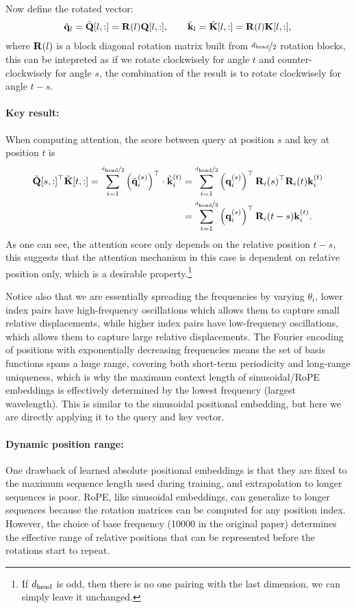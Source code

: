 \documentclass[11pt]{article}  %
\begin{document}
Now define the rotated vector: 
\begin{align}
  \tilde{\mathbf{q}}_l = \tilde{\mathbf{Q}}[l, :] = \mathbf{R}(l)\mathbf{Q}[l, :], \qquad \tilde{\mathbf{k}}_l = \tilde{\mathbf{K}}[l, :] = \mathbf{R}(l)\mathbf{K}[l, :],
\end{align}
where $\mathbf{R}(l)$ is a block diagonal rotation matrix built from $\nicefrac{d_{\text{head}}}{2}$ rotation blocks, this can be intepreted as if we rotate clockwisely for angle $t$ and counter-clockwisely for angle $s$, the combination of the result is to rotate clockwisely for angle $t-s$.

\paragraph{Key result:}
When computing attention, the score between query at position $s$ and key at position $t$ is 
\begin{align}
  \tilde{\mathbf{Q}}[s, :]^{\top}\tilde{\mathbf{K}}[t, :] = \sum_{i=1}^{\nicefrac{d_{\text{head}}}{2}} \left( \tilde{\mathbf{q}}_i^{(s)} \right)^{\top} \cdot \tilde{\mathbf{k}}_i^{(t)} &= \sum_{i=1}^{\nicefrac{d_{\text{head}}}{2}} \left( \mathbf{q}_i^{(s)} \right)^{\top} \mathbf{R}_i(s)^{\top}\mathbf{R}_i(t) \mathbf{k}_i^{(t)}\notag \\
  &= \sum_{i=1}^{\nicefrac{d_{\text{head}}}{2}} \left( \mathbf{q}_i^{(s)} \right)^{\top}\mathbf{R}_i(t - s) \mathbf{k}_i^{(t)}.
\end{align}
As one can see, the attention score only depends on the relative position $t - s$, this suggests that the attention mechanism in this case is dependent on relative position only, which is a desirable property.\footnote{If $d_{\text{head}}$ is odd, then there is no one pairing with the last dimension, we can simply leave it unchanged.}

Notice also that we are essentially spreading the frequencies by varying $\theta_i$, lower index pairs have high-frequency oscillations which allows them to capture small relative displacements, while higher index pairs have low-frequency oscillations, which allows them to capture large relative displacements.
The Fourier encoding of positions with exponentially decreasing frequencies means the set of basis functions spans a huge range, covering both short-term periodicity and long-range uniqueness, which is why the maximum context length of sinusoidal/RoPE embeddings is effectively determined by the lowest frequency (largest wavelength).
This is similar to the sinusoidal positional embedding, but here we are directly applying it to the query and key vector.


\paragraph{Dynamic position range:}
One drawback of learned absolute positional embeddings is that they are fixed to the maximum sequence length used during training, and extrapolation to longer sequences is poor.
RoPE, like sinusoidal embeddings, can generalize to longer sequences because the rotation matrices can be computed for any position index.
However, the choice of base frequency (10000 in the original paper) determines the effective range of relative positions that can be represented before the rotations start to repeat.
\end{document}
